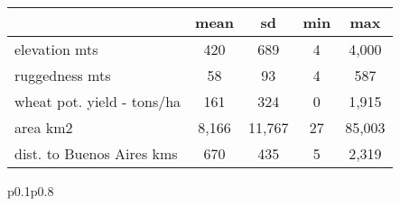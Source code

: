{
\begin{tabular}{lcccc}}{p{0.1\textwidth}p{0.8\textwidth}}
                    &        mean&          sd&         min&         max\\
\hline
elevation mts       &         420&         689&           4&       4,000\\
ruggedness mts      &          58&          93&           4&         587\\
wheat pot. yield - tons/ha&         161&         324&           0&       1,915\\
area km2            &       8,166&      11,767&          27&      85,003\\
dist. to Buenos Aires kms&         670&         435&           5&       2,319\\
\end{tabular}{p{0.1\textwidth}p{0.8\textwidth}}
}
